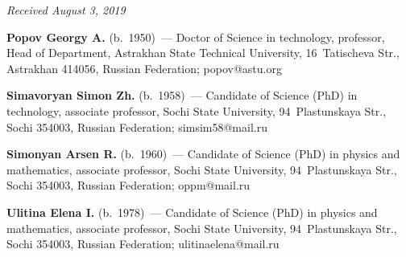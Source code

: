 
\hfill{\small\textit{Received August 3, 2019}}


  
  \Contr
  
  \noindent
  \textbf{Popov Georgy A.} (b.\ 1950)~--- Doctor of Science in technology, 
professor, Head of Department, Astrakhan State Technical University, 16~Tatischeva 
Str., Astrakhan 414056, Russian Federation; \mbox{popov@astu.org}
  
  \vspace*{6pt}
  
  \noindent
  \textbf{Simavoryan Simon Zh.} (b.\ 1958)~--- Candidate of Science (PhD) in 
technology, associate professor, Sochi State University, 94~Plastunskaya Str., Sochi 
354003, Russian Federation; \mbox{simsim58@mail.ru}
  
  \vspace*{6pt}
  
  \noindent
  \textbf{Simonyan Arsen R.} (b.\ 1960)~--- Candidate of Science (PhD) in physics 
and mathematics, associate professor, Sochi State University, 94~Plastunskaya Str., 
Sochi 354003, Russian Federation; \mbox{oppm@mail.ru}
  
  \vspace*{6pt}
  
  \noindent
  \textbf{Ulitina Elena I.} (b.\ 1978)~--- Candidate of Science (PhD) in physics and 
mathematics, associate professor, Sochi State University, 94~Plastunskaya Str., 
Sochi 354003, Russian Federation; \mbox{ulitinaelena@mail.ru}
\label{end\stat}

\renewcommand{\bibname}{\protect\rm Литература} 